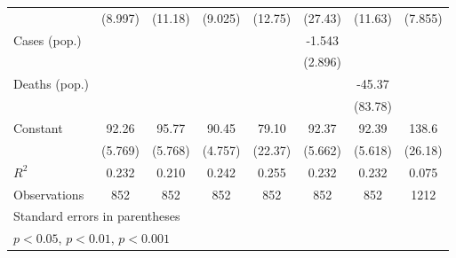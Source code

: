 \documentclass{article}
\begin{document}
{\begin{longtable}{l*{7}{c}}
                &  (8.997)         &  (11.18)         &  (9.025)         &  (12.75)         &  (27.43)         &  (11.63)         &  (7.855)         \\
Cases (pop.)    &                  &                  &                  &                  &   -1.543         &                  &                  \\
                &                  &                  &                  &                  &  (2.896)         &                  &                  \\
Deaths (pop.)   &                  &                  &                  &                  &                  &   -45.37         &                  \\
                &                  &                  &                  &                  &                  &  (83.78)         &                  \\
Constant        &    92.26\sym{***}&    95.77\sym{***}&    90.45\sym{***}&    79.10\sym{*}  &    92.37\sym{***}&    92.39\sym{***}&    138.6\sym{**} \\
                &  (5.769)         &  (5.768)         &  (4.757)         &  (22.37)         &  (5.662)         &  (5.618)         &  (26.18)         \\
\hline
\(R^{2}\)       &    0.232         &    0.210         &    0.242         &    0.255         &    0.232         &    0.232         &    0.075         \\
Observations    &      852         &      852         &      852         &      852         &      852         &      852         &     1212         \\
\hline\hline
\multicolumn{8}{l}{\footnotesize Standard errors in parentheses}\\
\multicolumn{8}{l}{\footnotesize \sym{*} \(p<0.05\), \sym{**} \(p<0.01\), \sym{***} \(p<0.001\)}\\
\end{longtable}
}
\end{document}
